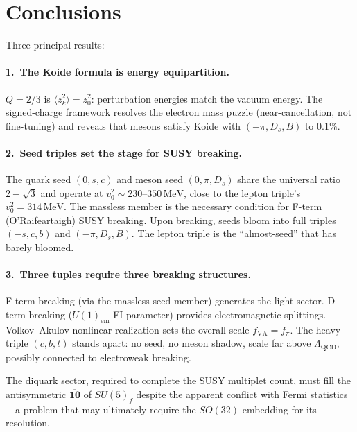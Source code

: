 \documentclass[12pt,a4paper]{article}
\newcommand{\MeV}{\,\text{MeV}}
\begin{document}
\section{Conclusions}
\label{sec:conclusions}

Three principal results:

\paragraph{1.\ The Koide formula is energy equipartition.}
$Q = 2/3$ is $\langle z_k^2\rangle = z_0^2$: perturbation energies 
match the vacuum energy. The signed-charge framework resolves the 
electron mass puzzle (near-cancellation, not fine-tuning) and reveals 
that mesons satisfy Koide with $(-\pi, D_s, B)$ to $0.1\%$.

\paragraph{2.\ Seed triples set the stage for SUSY breaking.}
The quark seed $(0,s,c)$ and meson seed $(0,\pi,D_s)$ share the 
universal ratio $2 - \sqrt{3}$ and operate at $v_0^2 \sim 
230$--$350\MeV$, close to the lepton triple's $v_0^2 = 314\MeV$. 
The massless member is the necessary condition for F-term 
(O'Raifeartaigh) SUSY breaking. Upon breaking, seeds bloom into 
full triples $(-s,c,b)$ and $(-\pi,D_s,B)$. The lepton triple 
is the ``almost-seed'' that has barely bloomed.

\paragraph{3.\ Three tuples require three breaking structures.}
F-term breaking (via the massless seed member) generates the light 
sector. D-term breaking ($U(1)_{\text{em}}$ FI parameter) provides 
electromagnetic splittings. Volkov--Akulov nonlinear realization 
sets the overall scale $f_{\text{VA}} = f_\pi$. The heavy triple 
$(c,b,t)$ stands apart: no seed, no meson shadow, scale far above 
$\Lambda_{\text{QCD}}$, possibly connected to electroweak breaking.

The diquark sector, required to complete the SUSY multiplet count, 
must fill the antisymmetric $\overline{\mathbf{10}}$ of $SU(5)_f$ 
despite the apparent conflict with Fermi statistics---a problem 
that may ultimately require the $SO(32)$ embedding for its 
resolution.
\end{document}
